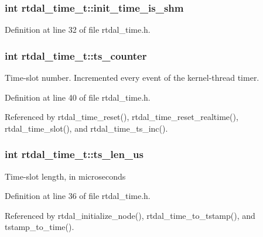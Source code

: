 \subsubsection[{init\-\_\-time\-\_\-is\-\_\-shm}]{\setlength{\rightskip}{0pt plus 5cm}int rtdal\-\_\-time\-\_\-t\-::init\-\_\-time\-\_\-is\-\_\-shm}\label{structrtdal__time__t_a13feacdb12d9a613582b8962634105b5}


Definition at line 32 of file rtdal\-\_\-time.\-h.

\subsubsection[{ts\-\_\-counter}]{\setlength{\rightskip}{0pt plus 5cm}int rtdal\-\_\-time\-\_\-t\-::ts\-\_\-counter}\label{structrtdal__time__t_a89a3ee16ee59251793149c861efa7594}
Time-\/slot number. Incremented every event of the kernel-\/thread timer. 

Definition at line 40 of file rtdal\-\_\-time.\-h.



Referenced by rtdal\-\_\-time\-\_\-reset(), rtdal\-\_\-time\-\_\-reset\-\_\-realtime(), rtdal\-\_\-time\-\_\-slot(), and rtdal\-\_\-time\-\_\-ts\-\_\-inc().

\subsubsection[{ts\-\_\-len\-\_\-us}]{\setlength{\rightskip}{0pt plus 5cm}int rtdal\-\_\-time\-\_\-t\-::ts\-\_\-len\-\_\-us}\label{structrtdal__time__t_a7973db38c7e50480f7a2251a722b8661}
Time-\/slot length, in microseconds 

Definition at line 36 of file rtdal\-\_\-time.\-h.



Referenced by rtdal\-\_\-initialize\-\_\-node(), rtdal\-\_\-time\-\_\-to\-\_\-tstamp(), and tstamp\-\_\-to\-\_\-time().

